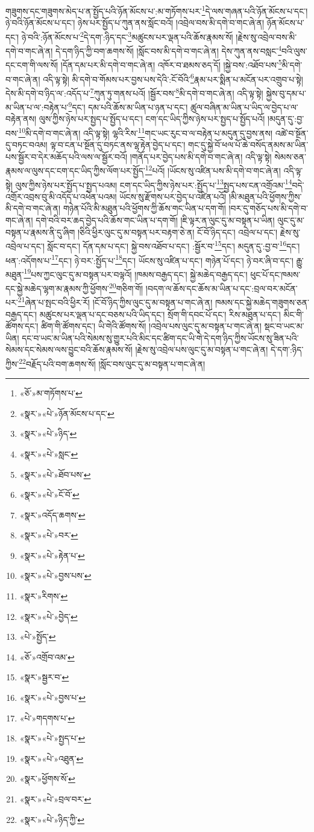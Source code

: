 གཟུགས་དང་གཟུགས་མེད་པ་ན་སྤྱོད་པའི་ཉོན་མོངས་པ་:མ་གཏོགས་པར་\footnote{«ཅོ་»མ་གཏོགས་པ་}དེ་ལས་གཞན་པའི་ཉོན་མོངས་པ་དང་། ཉེ་བའི་ཉོན་མོངས་པ་དང་། ཉེས་པར་སྤྱོད་པ་ཀུན་ནས་སློང་བའོ། །འབྲེལ་བས་མི་དགེ་བ་གང་ཞེ་ན། ཉོན་མོངས་པ་དང་། ཉེ་བའི་:ཉོན་མོངས་པ་\footnote{«སྣར་»«པེ་»ཉོན་མོངས་པ་དང་}དེ་དག་:ཉིད་དང་\footnote{«སྣར་»«པེ་»ཉིད་}མཚུངས་པར་ལྡན་པའི་ཆོས་རྣམས་སོ། །རྗེས་སུ་འབྲེལ་བས་མི་དགེ་བ་གང་ཞེ་ན། དེ་དག་ཉིད་ཀྱི་བག་ཆགས་སོ། །སློང་བས་མི་དགེ་བ་གང་ཞེ་ན། དེས་ཀུན་ནས་བསླང་\footnote{«སྣར་»«པེ་»སླང་}བའི་ལུས་དང་ངག་གི་ལས་སོ། །དོན་དམ་པར་མི་དགེ་བ་གང་ཞེ་ན། འཁོར་བ་ཐམས་ཅད་དོ། །སྐྱེ་བས་:འཐོབ་པས་\footnote{«སྣར་»«པེ་»ཐོབ་པས་}མི་དགེ་བ་གང་ཞེ་ན། འདི་ལྟ་སྟེ། མི་དགེ་བ་གོམས་པར་བྱས་པས་དེའི་:ངོ་བོའི་\footnote{«སྣར་»«པེ་»ངོ་བོ་}རྣམ་པར་སྨིན་པ་མངོན་པར་འགྲུབ་པ་སྟེ། དེས་མི་དགེ་བ་ཉིད་ལ་:འདོད་པ་\footnote{«སྣར་»འདོད་ཆགས་}ཀུན་ཏུ་གནས་པའོ། །སྦྱོར་བས་\footnote{«སྣར་»«པེ་»བར་}མི་དགེ་བ་གང་ཞེ་ན། འདི་ལྟ་སྟེ། སྐྱེས་བུ་དམ་པ་མ་ཡིན་པ་ལ་:བརྟེན་པ་\footnote{«སྣར་»«པེ་»རྟེན་པ་}དང་། དམ་པའི་ཆོས་མ་ཡིན་པ་ཉན་པ་དང་། ཚུལ་བཞིན་མ་ཡིན་པ་ཡིད་ལ་བྱེད་པ་ལ་བརྟེན་ནས། ལུས་ཀྱིས་ཉེས་པར་སྤྱད་པ་སྤྱོད་པ་དང་། ངག་དང་ཡིད་ཀྱིས་ཉེས་པར་སྤྱད་པ་སྤྱོད་པའོ། །མདུན་དུ་:བྱ་བས་\footnote{«སྣར་»«པེ་»བྱས་པས་}མི་དགེ་བ་གང་ཞེ་ན། འདི་ལྟ་སྟེ། ལྷའི་རིས་\footnote{«སྣར་»རིགས་}གང་ཡང་རུང་བ་ལ་བརྟེན་པ་མདུན་དུ་བྱས་ནས། འཚེ་བ་སྔོན་དུ་བཏང་བའམ། ལྟ་བ་ངན་པ་སྔོན་དུ་བཏང་ནས་ལྷ་རྟེན་བྱེད་པ་དང་། གང་དུ་སྐྱེ་བོ་ཕལ་པོ་ཆེ་བསོད་ནམས་མ་ཡིན་པས་སྦྱོར་བ་དེར་མཆོད་པའི་ལས་ལ་སྦྱོར་བའོ། །གནོད་པར་བྱེད་པས་མི་དགེ་བ་གང་ཞེ་ན། འདི་ལྟ་སྟེ། སེམས་ཅན་རྣམས་ལ་ལུས་དང་ངག་དང་ཡིད་ཀྱིས་ལོག་པར་སྤྱོད་\footnote{«སྣར་»«པེ་»བྱེད་}པའོ། །ཡོངས་སུ་འཛིན་པས་མི་དགེ་བ་གང་ཞེ་ན། འདི་ལྟ་སྟེ། ལུས་ཀྱིས་ཉེས་པར་སྤྱོད་པ་སྤྱད་པའམ། ངག་དང་ཡིད་ཀྱིས་ཉེས་པར་:སྤྱོད་པ་\footnote{«པེ་»སྤྱོད་}སྤྱད་པས་ངན་འགྲོའམ་\footnote{«ཅོ་»འགྲོབ་འམ་}བདེ་འགྲོར་འབྲས་བུ་མི་འདོད་པ་འཕེན་པའམ། ཡོངས་སུ་རྫོགས་པར་བྱེད་པ་འཛིན་པའོ། །མི་མཐུན་པའི་ཕྱོགས་ཀྱིས་མི་དགེ་བ་གང་ཞེ་ན། གཉེན་པོའི་མི་མཐུན་པའི་ཕྱོགས་ཀྱི་ཆོས་གང་ཡིན་པ་དག་གོ། །བར་དུ་གཅོད་པས་མི་དགེ་བ་གང་ཞེ་ན། དགེ་བའི་བར་ཆད་བྱེད་པའི་ཆོས་གང་ཡིན་པ་དག་གོ། །ཇི་ལྟར་ན་ལུང་དུ་མ་བསྟན་པ་ཡིན། ལུང་དུ་མ་བསྟན་པ་རྣམས་ནི་དུ་ཞིག །ཅིའི་ཕྱིར་ལུང་དུ་མ་བསྟན་པར་བརྟག་ཅེ་ན། ངོ་བོ་ཉིད་དང་། འབྲེལ་པ་དང་། རྗེས་སུ་འབྲེལ་པ་དང་། སློང་བ་དང་། དོན་དམ་པ་དང་། སྐྱེ་བས་འཐོབ་པ་དང་། :སྦྱོར་བ་\footnote{«སྣར་»སྦྱར་བ་}དང་། མདུན་དུ་:བྱ་བ་\footnote{«སྣར་»«པེ་»བྱས་པ་}དང་། ཕན་:འདོགས་པ་\footnote{«པེ་»གདགས་པ་}དང་། ཉེ་བར་:སྤྱོད་པ་\footnote{«སྣར་»«པེ་»སྤྱད་པ་}དང་། ཡོངས་སུ་འཛིན་པ་དང་། གཉེན་པོ་དང་། ཉེ་བར་ཞི་བ་དང་། རྒྱུ་མཐུན་\footnote{«སྣར་»«པེ་»འཐུན་}པས་ཀྱང་ལུང་དུ་མ་བསྟན་པར་བལྟའོ། །ཁམས་བརྒྱད་དང་། སྐྱེ་མཆེད་བརྒྱད་དང་། ཕུང་པོ་དང་ཁམས་དང་སྐྱེ་མཆེད་ལྷག་མ་རྣམས་ཀྱི་ཕྱོགས་\footnote{«སྣར་»ཕྱོགས་སོ་}གཅིག་གོ། །བདག་ལ་ཆོས་དང་ཆོས་མ་ཡིན་པ་དང་:བྲལ་བར་མངོན་པར་\footnote{«སྣར་»«པེ་»བྲལ་བར་}ཞེན་པ་སྤང་བའི་ཕྱིར་རོ། །ངོ་བོ་ཉིད་ཀྱིས་ལུང་དུ་མ་བསྟན་པ་གང་ཞེ་ན། ཁམས་དང་སྐྱེ་མཆེད་གཟུགས་ཅན་བརྒྱད་དང་། མཚུངས་པར་ལྡན་པ་དང་བཅས་པའི་ཡིད་དང་། སྲོག་གི་དབང་པོ་དང་། རིས་མཐུན་པ་དང་། མིང་གི་ཚོགས་དང་། ཚིག་གི་ཚོགས་དང་། ཡི་གེའི་ཚོགས་སོ། །འབྲེལ་པས་ལུང་དུ་མ་བསྟན་པ་གང་ཞེ་ན། སྡང་བ་ཡང་མ་ཡིན། དང་བ་ཡང་མ་ཡིན་པའི་སེམས་སུ་གྱུར་པའི་མིང་དང་ཚིག་དང་ཡི་གེ་དེ་དག་ཉིད་ཀྱིས་ཡོངས་སུ་ཟིན་པའི་སེམས་དང་སེམས་ལས་བྱུང་བའི་ཆོས་རྣམས་སོ། །རྗེས་སུ་འབྲེལ་པས་ལུང་དུ་མ་བསྟན་པ་གང་ཞེ་ན། དེ་དག་:ཉིད་ཀྱིས་\footnote{«སྣར་»«པེ་»ཉིད་ཀྱི་}བརྗོད་པའི་བག་ཆགས་སོ། །སློང་བས་ལུང་དུ་མ་བསྟན་པ་གང་ཞེ་ན། 